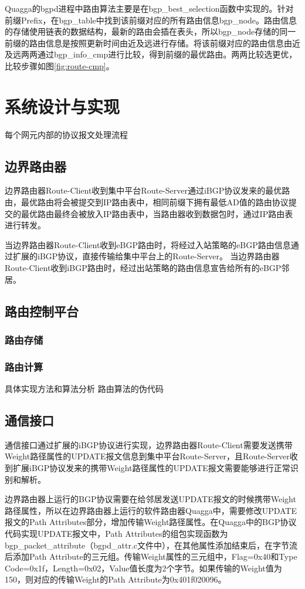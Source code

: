Quagga的bgpd进程中路由算法主要是在bgp\_best\_selection函数中实现的。针对前缀Prefix，在bgp\_table中找到该前缀对应的所有路由信息bgp\_node。路由信息的存储使用链表的数据结构，最新的路由会插在表头，所以bgp\_node存储的同一前缀的路由信息是按照更新时间由近及远进行存储。将该前缀对应的路由信息由近及远两两通过bgp\_info\_cmp进行比较，得到前缀的最优路由。两两比较选更优，比较步骤如图\ref{fig:route-cmp}。


\section{系统设计与实现}
每个网元内部的协议报文处理流程


\subsection{边界路由器}
边界路由器Route-Client收到集中平台Route-Server通过iBGP协议发来的最优路由，最优路由将会被提交到IP路由表中，相同前缀下拥有最低AD值的路由协议提交的最优路由最终会被放入IP路由表中，当路由器收到数据包时，通过IP路由表进行转发\cite{DianeTeare2016CCNP}。

当边界路由器Route-Client收到eBGP路由时，将经过入站策略的eBGP路由信息通过扩展的iBGP协议，直接传输给集中平台上的Route-Server。
当边界路由器Route-Client收到iBGP路由时，经过出站策略的路由信息宣告给所有的eBGP邻居。


\subsection{路由控制平台}
\subsubsection{路由存储}
\subsubsection{路由计算}
具体实现方法和算法分析
路由算法的伪代码

\subsection{通信接口}
通信接口通过扩展的iBGP协议进行实现，边界路由器Route-Client需要发送携带Weight路径属性的UPDATE报文信息到集中平台Route-Server，且Route-Server收到扩展iBGP协议发来的携带Weight路径属性的UPDATE报文需要能够进行正常识别和解析。

边界路由器上运行的BGP协议需要在给邻居发送UPDATE报文的时候携带Weight路径属性，所以在边界路由器上运行的软件路由器Quagga中，需要修改UPDATE报文的Path Attributes部分，增加传输Weight路径属性。在Quagga中的BGP协议代码实现UPDATE报文中，Path Attributes的组包实现函数为bgp\_packet\_attribute（bgpd\_attr.c文件中），在其他属性添加结束后，在字节流后添加Path Attribute的三元组。传输Weight属性的三元组中，Flag=0x40和Type Code=0x1f，Length=0x02，Value值长度为2个字节。如果传输的Weight值为150，则对应的传输Weight的Path  Attribute为0x401f020096。

